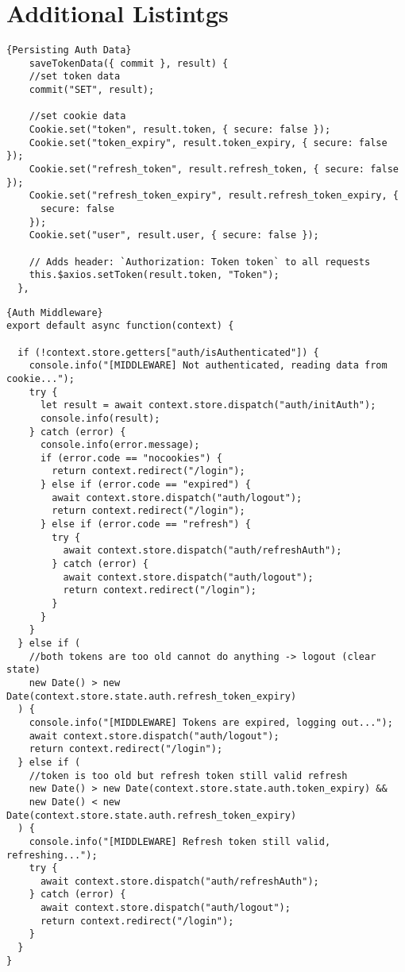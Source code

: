 \chapter{Additional Listintgs}

\begin{lstlisting}[caption=Persisting Auth Data, captionpos=b, style=htmlcssjs, label=persauthdata]{Persisting Auth Data}
    saveTokenData({ commit }, result) {
    //set token data
    commit("SET", result);

    //set cookie data
    Cookie.set("token", result.token, { secure: false });
    Cookie.set("token_expiry", result.token_expiry, { secure: false });
    Cookie.set("refresh_token", result.refresh_token, { secure: false });
    Cookie.set("refresh_token_expiry", result.refresh_token_expiry, {
      secure: false
    });
    Cookie.set("user", result.user, { secure: false });

    // Adds header: `Authorization: Token token` to all requests
    this.$axios.setToken(result.token, "Token");
  },
\end{lstlisting}

\begin{lstlisting}[caption=Auth Middleware, captionpos=b, style=htmlcssjs, label=authmiddleware]{Auth Middleware}
export default async function(context) {

  if (!context.store.getters["auth/isAuthenticated"]) {
    console.info("[MIDDLEWARE] Not authenticated, reading data from cookie...");
    try {
      let result = await context.store.dispatch("auth/initAuth");
      console.info(result);
    } catch (error) {
      console.info(error.message);
      if (error.code == "nocookies") {
        return context.redirect("/login");
      } else if (error.code == "expired") {
        await context.store.dispatch("auth/logout");
        return context.redirect("/login");
      } else if (error.code == "refresh") {
        try {
          await context.store.dispatch("auth/refreshAuth");
        } catch (error) {
          await context.store.dispatch("auth/logout");
          return context.redirect("/login");
        }
      }
    }
  } else if (
    //both tokens are too old cannot do anything -> logout (clear state)
    new Date() > new Date(context.store.state.auth.refresh_token_expiry)
  ) {
    console.info("[MIDDLEWARE] Tokens are expired, logging out...");
    await context.store.dispatch("auth/logout");
    return context.redirect("/login");
  } else if (
    //token is too old but refresh token still valid refresh
    new Date() > new Date(context.store.state.auth.token_expiry) &&
    new Date() < new Date(context.store.state.auth.refresh_token_expiry)
  ) {
    console.info("[MIDDLEWARE] Refresh token still valid, refreshing...");
    try {
      await context.store.dispatch("auth/refreshAuth");
    } catch (error) {
      await context.store.dispatch("auth/logout");
      return context.redirect("/login");
    }
  }
}
\end{lstlisting}

